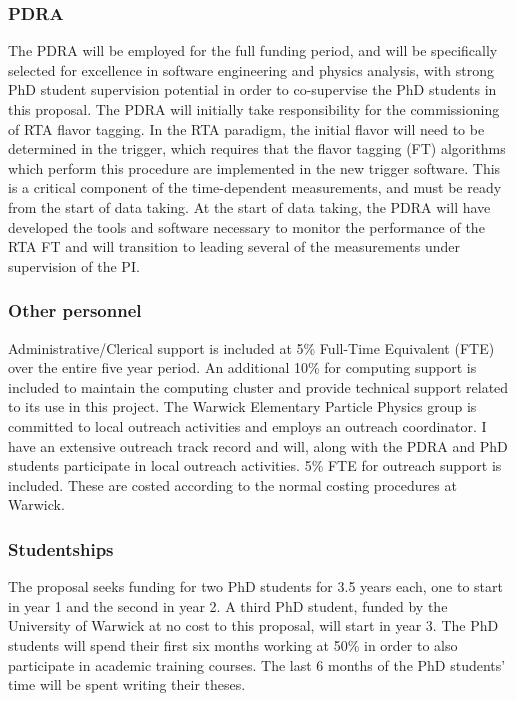 \documentclass[11pt,a4paper]{article}
\begin{document}
\subsubsection{PDRA}
The PDRA will be employed for the full funding period, and will be specifically selected for excellence in software engineering and physics analysis, with strong PhD student supervision potential in order to co-supervise the PhD students in this proposal. The PDRA will initially take responsibility for the commissioning of RTA flavor tagging. In the RTA paradigm, the initial \HepProcess{\PB-\APB} flavor will need to be determined in the trigger, which requires that the flavor tagging (FT) algorithms which perform this procedure are implemented in the new trigger software. This is a critical component of the time-dependent measurements, and must be ready from the start of data taking. At the start of data taking, the PDRA will have developed the tools and software necessary to monitor the performance of the RTA FT and will transition to leading several of the \CP measurements under supervision of the PI. 

\subsubsection{Other personnel}
Administrative/Clerical support is included at 5\% Full-Time Equivalent (FTE) over the entire five year period. An additional 10\% for computing support is included to maintain the computing cluster and provide technical support related to its use in this project. The Warwick Elementary Particle Physics group is committed to local outreach activities and employs an outreach coordinator. I have an extensive outreach track record and will, along with the PDRA and PhD students participate in local outreach activities. 5\% FTE for outreach support is included. These are costed according to the normal costing procedures at Warwick.

\subsubsection{Studentships} 
The proposal seeks funding for two PhD students for 3.5 years each, one to start in year 1 and the second in year 2. A third PhD student, funded by the University of Warwick at no cost to this proposal, will start in year 3. The PhD students will spend their first six months working at 50\% in order to also participate in academic training courses. The last 6 months of the PhD students' time will be spent writing their theses. 
\end{document}
